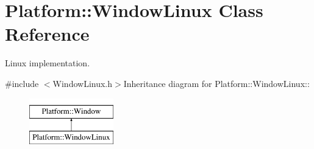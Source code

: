 \hypertarget{classPlatform_1_1WindowLinux}{
\section{Platform::WindowLinux Class Reference}
\label{classPlatform_1_1WindowLinux}
}


Linux implementation.  


{\ttfamily \#include $<$WindowLinux.h$>$}Inheritance diagram for Platform::WindowLinux::\begin{figure}[H]
\begin{center}
\leavevmode
\includegraphics[height=2cm]{classPlatform_1_1WindowLinux}
\end{center}
\end{figure}
